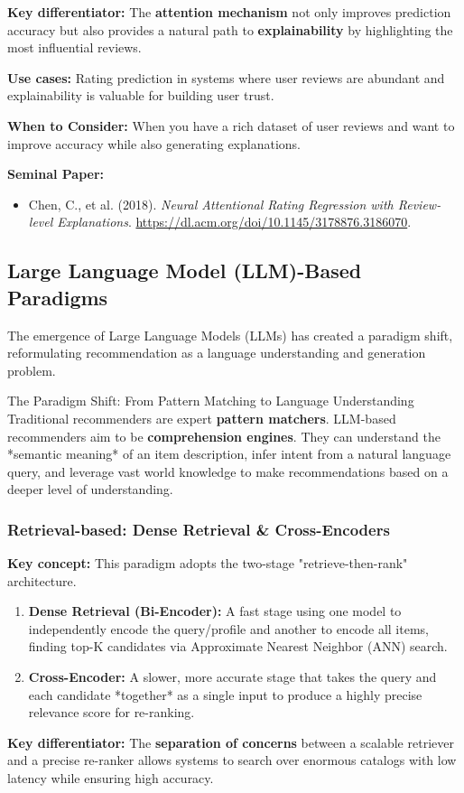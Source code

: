 \documentclass{article}
\begin{document}
\noindent\textbf{Key differentiator:} The \textbf{attention mechanism} not only improves prediction accuracy but also provides a natural path to \textbf{explainability} by highlighting the most influential reviews.

\noindent\textbf{Use cases:} Rating prediction in systems where user reviews are abundant and explainability is valuable for building user trust.

\noindent\textbf{When to Consider:} When you have a rich dataset of user reviews and want to improve accuracy while also generating explanations.

\noindent\textbf{Seminal Paper:}
    \begin{itemize}
        \item Chen, C., et al. (2018). \textit{Neural Attentional Rating Regression with Review-level Explanations}. \url{https://dl.acm.org/doi/10.1145/3178876.3186070}.
    \end{itemize}
    
    \subsection{Large Language Model (LLM)-Based Paradigms}
    The emergence of Large Language Models (LLMs) has created a paradigm shift, reformulating recommendation as a language understanding and generation problem.
    
    \begin{asidebox}{The Paradigm Shift: From Pattern Matching to Language Understanding}
    Traditional recommenders are expert \textbf{pattern matchers}. LLM-based recommenders aim to be \textbf{comprehension engines}. They can understand the *semantic meaning* of an item description, infer intent from a natural language query, and leverage vast world knowledge to make recommendations based on a deeper level of understanding.
    \end{asidebox}

    \subsubsection{Retrieval-based: Dense Retrieval \& Cross-Encoders}
\noindent\textbf{Key concept:} This paradigm adopts the two-stage "retrieve-then-rank" architecture.
    \begin{enumerate}
        \item \textbf{Dense Retrieval (Bi-Encoder):} A fast stage using one model to independently encode the query/profile and another to encode all items, finding top-K candidates via Approximate Nearest Neighbor (ANN) search.
        \item \textbf{Cross-Encoder:} A slower, more accurate stage that takes the query and each candidate *together* as a single input to produce a highly precise relevance score for re-ranking.
    \end{enumerate}
\noindent\textbf{Key differentiator:} The \textbf{separation of concerns} between a scalable retriever and a precise re-ranker allows systems to search over enormous catalogs with low latency while ensuring high accuracy.
\end{document}
